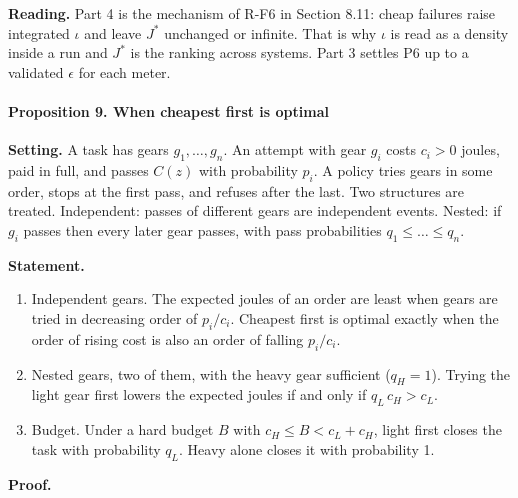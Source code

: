 \documentclass[
  10pt,
]{article}
\providecommand{\tightlist}{%
  \setlength{\itemsep}{0pt}\setlength{\parskip}{0pt}}
\begin{document}
\textbf{Reading.} Part 4 is the mechanism of R-F6 in Section 8.11: cheap
failures raise integrated \(\iota\) and leave \(J^*\) unchanged or
infinite. That is why \(\iota\) is read as a density inside a run and
\(J^*\) is the ranking across systems. Part 3 settles P6 up to a
validated \(\epsilon\) for each meter.

\paragraph{Proposition 9. When cheapest first is
optimal}\label{proposition-9.-when-cheapest-first-is-optimal}

\textbf{Setting.} A task has gears \(g_1, \dots, g_n\). An attempt with
gear \(g_i\) costs \(c_i > 0\) joules, paid in full, and passes \(C(z)\)
with probability \(p_i\). A policy tries gears in some order, stops at
the first pass, and refuses after the last. Two structures are treated.
Independent: passes of different gears are independent events. Nested:
if \(g_i\) passes then every later gear passes, with pass probabilities
\(q_1 \le \dots \le q_n\).

\textbf{Statement.}

\begin{enumerate}
\def\labelenumi{\arabic{enumi}.}
\tightlist
\item
  Independent gears. The expected joules of an order are least when
  gears are tried in decreasing order of \(p_i/c_i\). Cheapest first is
  optimal exactly when the order of rising cost is also an order of
  falling \(p_i/c_i\).
\item
  Nested gears, two of them, with the heavy gear sufficient
  (\(q_H = 1\)). Trying the light gear first lowers the expected joules
  if and only if \(q_L\,c_H > c_L\).
\item
  Budget. Under a hard budget \(B\) with \(c_H \le B < c_L + c_H\),
  light first closes the task with probability \(q_L\). Heavy alone
  closes it with probability 1.
\end{enumerate}

\textbf{Proof.}
\end{document}
